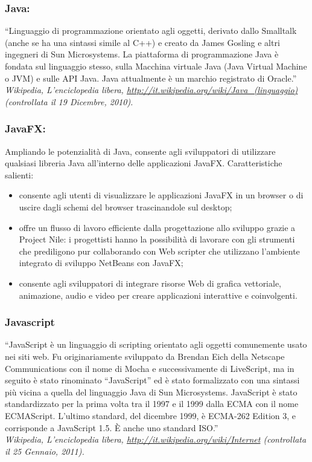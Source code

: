 \subsubsection*{Java:} ``Linguaggio di programmazione orientato agli oggetti,
derivato dallo Smalltalk (anche se ha una sintassi simile al C++) e creato da
James Gosling e altri ingegneri di Sun Microsystems. La piattaforma di
programmazione Java \`e fondata sul linguaggio stesso, sulla Macchina virtuale
Java (Java Virtual Machine o JVM) e sulle API Java. Java attualmente \`e un
marchio registrato di Oracle.''\\
\emph{Wikipedia, L'enciclopedia libera,
\url{http://it.wikipedia.org/wiki/Java_(linguaggio)} (controllata il 19
Dicembre, 2010).}

\subsubsection*{JavaFX:} Ampliando le potenzialit\`a di Java, consente agli
sviluppatori di utilizzare qualsiasi libreria Java all'interno delle applicazioni JavaFX.
Caratteristiche salienti:
\begin{itemize}
\item consente agli utenti di visualizzare le applicazioni JavaFX in un browser
o di uscire dagli schemi del browser trascinandole sul desktop; 
\item offre un flusso di lavoro efficiente dalla progettazione allo sviluppo
grazie a Project Nile: i progettisti hanno la possibilit\`a di lavorare con gli strumenti
che prediligono pur collaborando con Web scripter che utilizzano l'ambiente
integrato di sviluppo NetBeans con JavaFX;
\item consente agli sviluppatori di integrare risorse Web di grafica vettoriale,
animazione, audio e video per creare applicazioni interattive e coinvolgenti.
\end{itemize}

\subsubsection*{Javascript}
``JavaScript \`e un linguaggio di scripting orientato agli oggetti comunemente
usato nei siti web. Fu originariamente sviluppato da Brendan Eich della Netscape
Communications con il nome di Mocha e successivamente di LiveScript, ma in
seguito \`e stato rinominato ``JavaScript'' ed \`e stato formalizzato con una
sintassi pi\`u vicina a quella del linguaggio Java di Sun Microsystems.
JavaScript \`e stato standardizzato per la prima volta tra il 1997 e il 1999
dalla ECMA con il nome ECMAScript. L'ultimo standard, del dicembre 1999, \`e ECMA-262 Edition 3, e
corrisponde a JavaScript 1.5. \`E anche uno standard ISO.''\\ 
\emph{Wikipedia, L'enciclopedia libera,
\url{http://it.wikipedia.org/wiki/Internet} (controllata il 25 Gennaio, 2011).}


